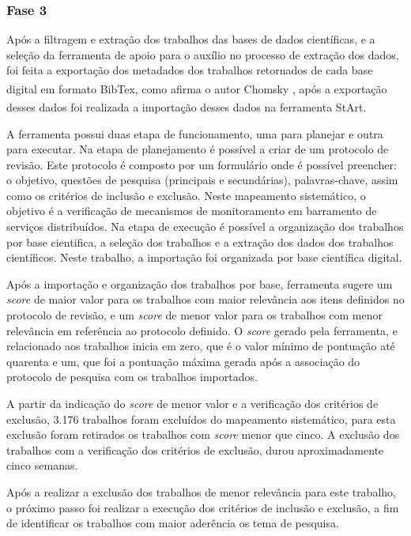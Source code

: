 \subsubsection{Fase 3} Após a filtragem e extração dos trabalhos das bases de dados científicas, e a seleção da ferramenta de apoio para o auxílio no processo de extração dos dados, foi feita a exportação dos metadados dos trabalhos retornados de cada base digital em formato BibTex\textsuperscript{\textregistered}, como afirma o autor Chomsky \cite{chomsky1969linguistica}, após a exportação desses dados foi realizada a importação desses dados na ferramenta \acrshort{StArt}\textsuperscript{\textregistered}. 

A ferramenta possui duas etapa de funcionamento, uma para planejar e outra para executar. Na etapa de planejamento é possível a criar de um protocolo de revisão. Este protocolo é composto por um formulário onde é possível preencher: o objetivo, questões de pesquisa (principais e secundárias), palavras-chave, assim como os critérios de inclusão e exclusão. Neste mapeamento sistemático, o objetivo é a verificação de mecanismos de monitoramento em barramento de serviços distribuídos. Na etapa de execução é possível a organização dos trabalhos por base cientifica, a seleção dos trabalhos e a extração dos dados dos trabalhos científicos. Neste trabalho, a importação foi organizada por base científica digital. 

Após a importação e organização dos trabalhos por base, ferramenta sugere um \textit{score} de maior valor para os trabalhos com maior relevância aos itens definidos no protocolo de revisão, e um \textit{score} de menor valor para os trabalhos com menor relevância em referência ao protocolo definido. O \textit{score} gerado pela ferramenta, e relacionado aos trabalhos inicia em zero, que é o valor mínimo de pontuação até quarenta e um, que foi a pontuação máxima gerada após a associação do protocolo de pesquisa com os trabalhos importados. 

A partir da indicação do \textit{score} de menor valor e a verificação dos critérios de exclusão, 3.176 trabalhos foram excluídos do mapeamento sistemático, para esta exclusão foram retirados os trabalhos com \textit{score} menor que cinco. A exclusão dos trabalhos com a verificação dos critérios de exclusão, durou aproximadamente cinco semanas. 

Após a realizar a exclusão dos trabalhos de menor relevância para este trabalho, o próximo passo foi realizar a execução dos critérios de inclusão e exclusão, a fim de identificar os trabalhos com maior aderência os tema de pesquisa. 

